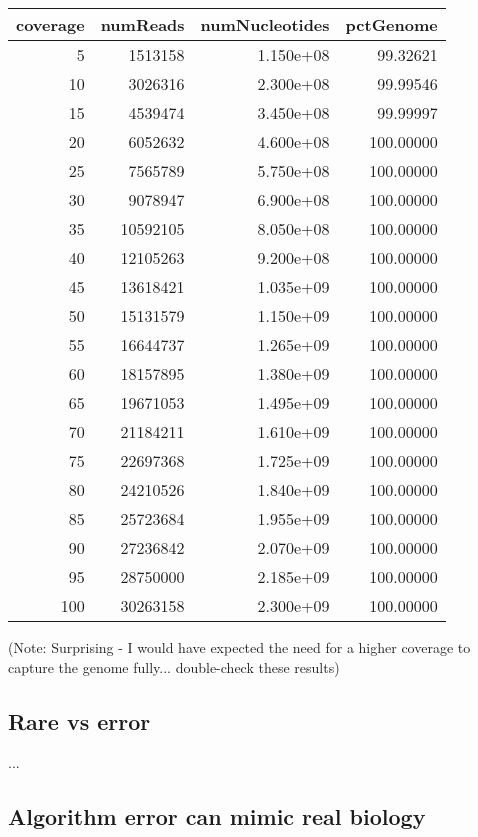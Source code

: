 \begin{tabular}{r|r|r|r}
\hline
coverage & numReads & numNucleotides & pctGenome\\
\hline
5 & 1513158 & 1.150e+08 & 99.32621\\
\hline
10 & 3026316 & 2.300e+08 & 99.99546\\
\hline
15 & 4539474 & 3.450e+08 & 99.99997\\
\hline
20 & 6052632 & 4.600e+08 & 100.00000\\
\hline
25 & 7565789 & 5.750e+08 & 100.00000\\
\hline
30 & 9078947 & 6.900e+08 & 100.00000\\
\hline
35 & 10592105 & 8.050e+08 & 100.00000\\
\hline
40 & 12105263 & 9.200e+08 & 100.00000\\
\hline
45 & 13618421 & 1.035e+09 & 100.00000\\
\hline
50 & 15131579 & 1.150e+09 & 100.00000\\
\hline
55 & 16644737 & 1.265e+09 & 100.00000\\
\hline
60 & 18157895 & 1.380e+09 & 100.00000\\
\hline
65 & 19671053 & 1.495e+09 & 100.00000\\
\hline
70 & 21184211 & 1.610e+09 & 100.00000\\
\hline
75 & 22697368 & 1.725e+09 & 100.00000\\
\hline
80 & 24210526 & 1.840e+09 & 100.00000\\
\hline
85 & 25723684 & 1.955e+09 & 100.00000\\
\hline
90 & 27236842 & 2.070e+09 & 100.00000\\
\hline
95 & 28750000 & 2.185e+09 & 100.00000\\
\hline
100 & 30263158 & 2.300e+09 & 100.00000\\
\hline
\end{tabular}



(Note: Surprising - I would have expected the need for a higher coverage to capture the genome fully... double-check these results)

\subsection{Rare vs error}

...

\subsection{Algorithm error can mimic real biology}

